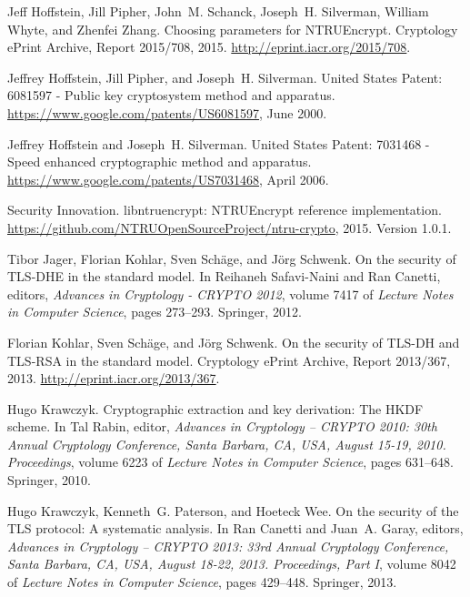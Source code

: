 \documentclass[USenglish,oneside,twocolumn]{article}
\theoremstyle{dgthm}
\theoremstyle{dgdef}
\begin{document}
\begin{thebibliography}{10}
Jeff Hoffstein, Jill Pipher, John~M. Schanck, Joseph~H. Silverman, William
  Whyte, and Zhenfei Zhang.
\newblock Choosing parameters for {NTRUEncrypt}.
\newblock Cryptology ePrint Archive, Report 2015/708, 2015.
\newblock \url{http://eprint.iacr.org/2015/708}.

Jeffrey Hoffstein, Jill Pipher, and Joseph~H. Silverman.
\newblock United {States} {Patent}: 6081597 - {Public} key cryptosystem method
  and apparatus.
\newblock \url{https://www.google.com/patents/US6081597}, June 2000.

Jeffrey Hoffstein and Joseph~H. Silverman.
\newblock United {States} {Patent}: 7031468 - {Speed} enhanced cryptographic
  method and apparatus.
\newblock \url{https://www.google.com/patents/US7031468}, April 2006.

Security Innovation.
\newblock libntruencrypt: {NTRUEncrypt} reference implementation.
\newblock \url{https://github.com/NTRUOpenSourceProject/ntru-crypto}, 2015.
\newblock Version 1.0.1.

Tibor Jager, Florian Kohlar, Sven Sch{\"a}ge, and J{\"o}rg Schwenk.
\newblock On the security of {TLS}-{DHE} in the standard model.
\newblock In Reihaneh Safavi-Naini and Ran Canetti, editors, {\em Advances in
  {Cryptology} - {CRYPTO} 2012}, volume 7417 of {\em Lecture {Notes} in
  {Computer} {Science}}, pages 273--293. Springer, 2012.

Florian Kohlar, Sven Sch{\"a}ge, and J{\"o}rg Schwenk.
\newblock On the security of {TLS}-{DH} and {TLS}-{RSA} in the standard model.
\newblock Cryptology ePrint Archive, Report 2013/367, 2013.
\newblock \url{http://eprint.iacr.org/2013/367}.

Hugo Krawczyk.
\newblock Cryptographic extraction and key derivation: The {HKDF} scheme.
\newblock In Tal Rabin, editor, {\em Advances in {Cryptology} -- {CRYPTO} 2010:
  30th Annual Cryptology Conference, Santa Barbara, CA, USA, August 15-19,
  2010. Proceedings}, volume 6223 of {\em Lecture {Notes} in {Computer}
  {Science}}, pages 631--648. Springer, 2010.

Hugo Krawczyk, Kenneth~G. Paterson, and Hoeteck Wee.
\newblock On the security of the {TLS} protocol: {A} systematic analysis.
\newblock In Ran Canetti and Juan~A. Garay, editors, {\em Advances in
  Cryptology -- {CRYPTO} 2013: 33rd Annual Cryptology Conference, Santa
  Barbara, CA, USA, August 18-22, 2013. Proceedings, Part I}, volume 8042 of
  {\em Lecture {Notes} in {Computer} {Science}}, pages 429--448. Springer,
  2013.


\end{thebibliography}
\end{document}
